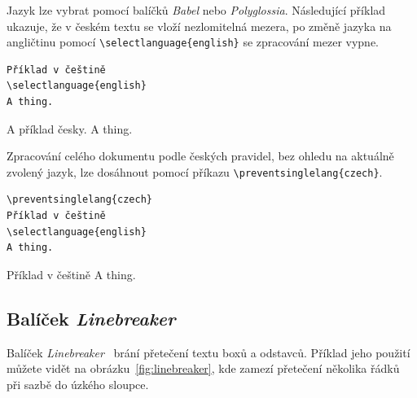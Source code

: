 \documentclass{csbulletin}
\newcommand\balicek[1]{\textit{#1}}
\begin{document}
Jazyk lze  vybrat pomocí balíčků \balicek{Babel} nebo \balicek{Polyglossia}. Následující příklad
ukazuje, že v českém textu se vloží nezlomitelná mezera, po změně jazyka na angličtinu pomocí
\verb|\selectlanguage{english}| se zpracování mezer vypne. 
  


\begin{verbatim}
Příklad v češtině
\selectlanguage{english}
A thing.
\end{verbatim}

\preventsingledebugon

\noindent 
A příklad česky.
A thing.

\preventsingledebugoff



\bigskip

Zpracování celého dokumentu podle českých pravidel, bez ohledu na aktuálně zvolený jazyk, lze dosáhnout pomocí příkazu 
\verb|\preventsinglelang{czech}|.

\begin{verbatim}
\preventsinglelang{czech}
Příklad v češtině
\selectlanguage{english}
A thing.
\end{verbatim}

\preventsingledebugon

\noindent Příklad v češtině
A thing.

\preventsingledebugoff
{}

\subsection{Balíček \balicek{Linebreaker}}

\newcommand\testbox[1]{%
  \parbox{120pt}{%
    \parindent=15pt%
    \tolerance=1%
    \pretolerance=1%
    #1
  }%
}


\newcommand\printtest[1]{%
  \linebreakerdisable%
  \begin{subfigure}[b]{.45\textwidth}
    \centering
  \noindent\testbox{%
    #1
  }%
  \caption{Bez balíčku \balicek{Linebreaker}}
  \end{subfigure}
  \linebreakerenable%
  \hfill%
  \begin{subfigure}[b]{.45\textwidth}
    \centering
  \testbox{%
    #1
  }%
  \medskip
  \caption{S balíčkem \balicek{Linebreaker}}
  \end{subfigure}
}

Balíček \balicek{Linebreaker}~\cite{linebreaker} brání přetečení textu boxů a odstavců. 
Příklad jeho použití můžete vidět na obrázku~\ref{fig:linebreaker}, kde zamezí přetečení 
několika řádků při sazbě do úzkého sloupce. 
\end{document}
